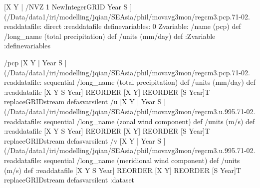 [X    Y | /NVZ 1 NewIntegerGRID
   Year S ] (/Data/data1/iri/modelling/jqian/SEAsia/phil/movavg3mon/regcm3.pcp.71-02.%
readdatafile: 
direct
:readdatafile
definevariables:
0 Zvariable: /name (pcp) def /long_name (total precipitation)  def /units (mm/day) def
:Zvariable
:definevariables
\begin{ingrid}
/pcp {
[X    Y |
   Year S ] (/Data/data1/iri/modelling/jqian/SEAsia/phil/movavg3mon/regcm3.pcp.71-02.%
readdatafile: 
sequential
/long_name (total precipitation)  def /units (mm/day) def
:readdatafile
[X Y S Year] REORDER
[X Y] REORDER
[S Year]T replaceGRIDstream
} defasvarsilent
/u {
[X    Y |
   Year S ] (/Data/data1/iri/modelling/jqian/SEAsia/phil/movavg3mon/regcm3.u.995.71-02.%
readdatafile: 
sequential
/long_name (zonal wind component)  def /units (m/s) def
:readdatafile
[X Y S Year] REORDER
[X Y] REORDER
[S Year]T replaceGRIDstream
} defasvarsilent
/v {
[X    Y |
   Year S ] (/Data/data1/iri/modelling/jqian/SEAsia/phil/movavg3mon/regcm3.u.995.71-02.%
readdatafile: 
sequential
/long_name (meridional wind component)  def /units (m/s) def
:readdatafile
[X Y S Year] REORDER
[X Y] REORDER
[S Year]T replaceGRIDstream
} defasvarsilent
:dataset

\end{ingrid}
